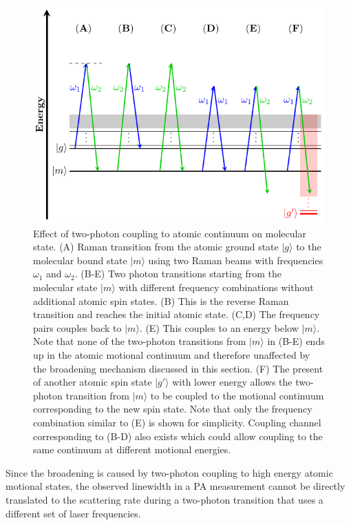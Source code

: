 \begin{figure}
  \centering
  \includegraphics[width=\textwidth]{figures/pa_two_photon_down_raman.pdf}
  \caption[Two-photon transition from molecular state]{
    Effect of two-photon coupling to atomic continuum on molecular state.
    (A) Raman transition from the atomic ground state $|g\rangle$
    to the molecular bound state $|m\rangle$ using two Raman beams with frequencies
    $\omega_1$ and $\omega_2$.
    (B-E) Two photon transitions starting from the molecular state $|m\rangle$
    with different frequency combinations without additional atomic spin states.
    (B) This is the reverse Raman transition and reaches the initial atomic state.
    (C,D) The frequency pairs couples back to $|m\rangle$.
    (E) This couples to an energy below $|m\rangle$.
    Note that none of the two-photon transitions from $|m\rangle$ in (B-E) ends up in
    the atomic motional continuum and therefore unaffected by the broadening mechanism
    discussed in this section.
    (F) The present of another atomic spin state $|g'\rangle$ with lower energy
    allows the two-photon transition from $|m\rangle$ to be coupled to the
    motional continuum corresponding to the new spin state.
    Note that only the frequency combination similar to (E) is shown for simplicity.
    Coupling channel corresponding to (B-D) also exists which could allow coupling
    to the same continuum at different motional energies.
    \label{fig:pa:linewidth:two-photon-down-raman}}
\end{figure}

Since the broadening is caused by two-photon coupling to high energy atomic motional states,
the observed linewidth in a PA measurement cannot be directly translated to
the scattering rate during a two-photon transition that uses a different set of laser frequencies.

